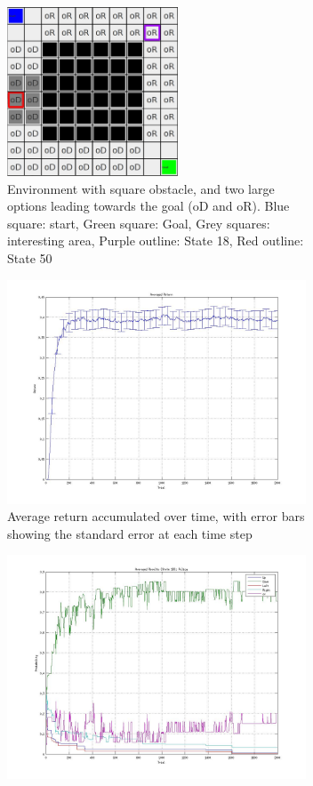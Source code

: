 \documentclass{acm_proc_article-sp}
\begin{document}
\begin{figure}[!htbp]
  \begin{subfigure}[h]{.4\textwidth}
  	\centering
    \includegraphics[width=2in]{ops.png}
    \caption{Environment with square obstacle, and two large options leading towards the goal (oD and oR). Blue square: start, Green square: Goal, Grey squares: interesting area, Purple outline: State 18, Red outline: State 50}
  \end{subfigure}\hfill
  \begin{subfigure}[h]{.45\textwidth}
  \centering
    \includegraphics[width=3.5in]{return.jpeg}
    \caption{Average return accumulated over time, with error bars showing the standard error at each time step}
  \end{subfigure}
  \hfill
  \begin{subfigure}[h]{.45\textwidth}
  \centering
    \includegraphics[width=3.5in]{pol18.jpeg}

\end{subfigure}
\end{figure}
\end{document}
